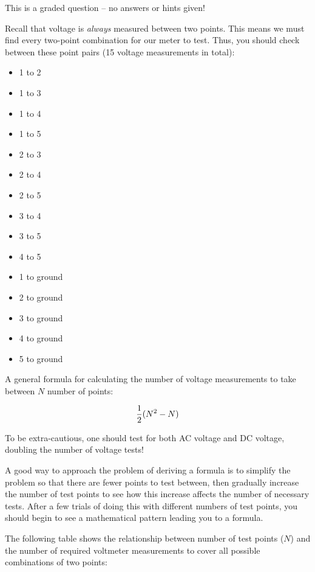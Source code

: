 This is a graded question -- no answers or hints given!







Recall that voltage is {\it always} measured between two points.  This means we must find every two-point combination for our meter to test.  Thus, you should check between these point pairs (15 voltage measurements in total):

\begin{itemize}
\item{} 1 to 2
\item{} 1 to 3
\item{} 1 to 4
\item{} 1 to 5
\item{} 2 to 3
\item{} 2 to 4
\item{} 2 to 5
\item{} 3 to 4
\item{} 3 to 5
\item{} 4 to 5
\item{} 1 to ground
\item{} 2 to ground
\item{} 3 to ground
\item{} 4 to ground
\item{} 5 to ground
\end{itemize}

A general formula for calculating the number of voltage measurements to take between $N$ number of points:

$${1 \over 2}(N^2 - N)$$

\vskip 10pt

To be extra-cautious, one should test for both AC voltage and DC voltage, doubling the number of voltage tests!

\vskip 10pt

A good way to approach the problem of deriving a formula is to simplify the problem so that there are fewer points to test between, then gradually increase the number of test points to see how this increase affects the number of necessary tests.  After a few trials of doing this with different numbers of test points, you should begin to see a mathematical pattern leading you to a formula.

The following table shows the relationship between number of test points ($N$) and the number of required voltmeter measurements to cover all possible combinations of two points:

